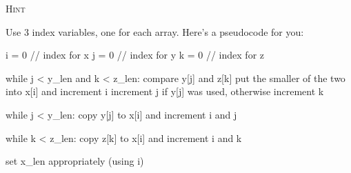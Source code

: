 \newpage
\textsc{Hint}

Use 3 index variables, one for each array.
Here's a pseudocode for you:
\begin{console}[fontsize=\small]
i = 0 // index for x
j = 0 // index for y
k = 0 // index for z

while j < y_len and k < z_len:
    compare y[j] and z[k]
    put the smaller of the two into x[i] and increment i
    increment j if y[j] was used, otherwise increment k

while j < y_len:
    copy y[j] to x[i] and increment i and j

while k < z_len:
    copy z[k] to x[i] and increment i and k

set x_len appropriately (using i)
\end{console}

